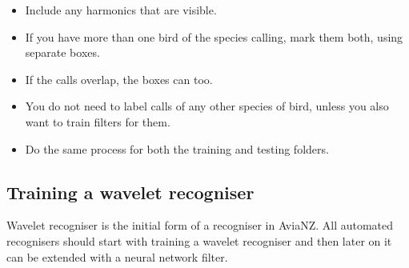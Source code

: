 \documentclass{article}
\begin{document}
\begin{description}
\begin{itemize}
\item Include any harmonics that are visible. 
\item If you have more than one bird of the species calling, mark them both, using separate boxes. 
\item If the calls overlap, the boxes can too. 
\item You do not need to label calls of any other species of bird, unless you also want to train filters for them. 
\item Do the same process for both the training and testing folders.
\end{itemize}
\end{description}

\subsection{Training a wavelet recogniser}
Wavelet recogniser is the initial form of a recogniser in AviaNZ. All automated recognisers should start with training a wavelet recogniser and then later on it can be extended with a neural network filter.
\end{document}
